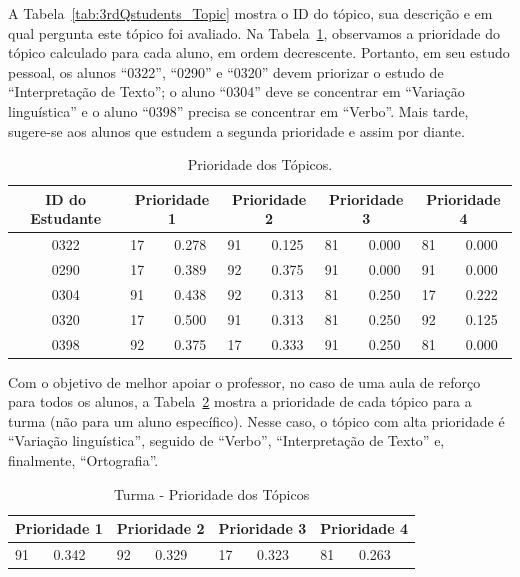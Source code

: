 A Tabela~\ref{tab:3rdQstudents_Topic} mostra o ID do tópico, sua descrição e em qual pergunta este tópico foi avaliado. Na Tabela~\ref{tab:3rdQstudents_Priority}, observamos a prioridade do tópico calculado para cada aluno, em ordem decrescente. Portanto, em seu estudo pessoal, os alunos ``0322'', ``0290'' e ``0320'' devem priorizar o estudo de ``Interpretação de Texto''; o aluno ``0304'' deve se concentrar em ``Variação linguística'' e o aluno ``0398'' precisa se concentrar em ``Verbo''. Mais tarde, sugere-se aos alunos que estudem a segunda prioridade e assim por diante.

\begin{table}[htbp]
\caption{Prioridade dos Tópicos.}
\centering
\begin{tabular}{|c|l|c|l|c|l|c|l|c|}
\hline
\textbf{ID do Estudante} & \multicolumn{2}{c|}{\textbf{Prioridade 1}} & \multicolumn{2}{c|}{\textbf{Prioridade 2}} & \multicolumn{2}{c|}{\textbf{Prioridade 3}} & \multicolumn{2}{c|}{\textbf{Prioridade 4}} \\ \hline
0322 & 17 & 0.278 & 91 & 0.125 & 81 & 0.000 & 81 & 0.000 \\ \hline
0290 & 17 & 0.389 & 92 & 0.375 & 91 & 0.000 & 91 & 0.000 \\ \hline
0304 & 91 & 0.438 & 92 & 0.313 & 81 & 0.250 & 17 & 0.222 \\ \hline
0320 & 17 & 0.500 & 91 & 0.313 & 81 & 0.250 & 92 & 0.125 \\ \hline
0398 & 92 & 0.375 & 17 & 0.333 & 91 & 0.250 & 81 & 0.000 \\ \hline
\end{tabular}
\label{tab:3rdQstudents_Priority}
\end{table}

Com o objetivo de melhor apoiar o professor, no caso de uma aula de reforço para todos os alunos, a Tabela~\ref{tab:Portuguese_PriorityClass} mostra a prioridade de cada tópico para a turma (não para um aluno específico). Nesse caso, o tópico com alta prioridade é ``Variação linguística'', seguido de ``Verbo'', ``Interpretação de Texto'' e, finalmente, ``Ortografia''.

\begin{table}[htbp]
\caption{Turma - Prioridade dos Tópicos}
\centering
\begin{tabular}{|l|l|l|l|l|l|l|l|}
\hline
\multicolumn{2}{|c|}{\textbf{Prioridade 1}} & \multicolumn{2}{c|}{\textbf{Prioridade 2}} & \multicolumn{2}{c|}{\textbf{Prioridade 3}} & \multicolumn{2}{c|}{\textbf{Prioridade 4}} \\ \hline
91 & 0.342 & 92 & 0.329 & 17 & 0.323 & 81 & 0.263 \\ \hline
\end{tabular}
\label{tab:Portuguese_PriorityClass}
\end{table}

